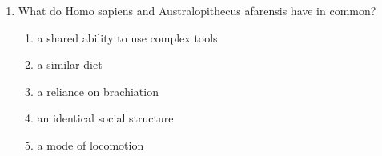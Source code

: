 \documentclass[12pt]{article}
\begin{document}
\begin{enumerate}[label=\arabic*.]
\begin{enumerate}[label=(\alph*)]
    \item both a and b
    \item Clovis
    \item Gravettian
    \item Mousterian
    \item Acheulean
\end{enumerate}
\item What do Homo sapiens and Australopithecus afarensis have in common?
\begin{enumerate}[label=(\alph*)]
    \item a shared ability to use complex tools
    \item a similar diet
    \item a reliance on brachiation
    \item an identical social structure
    \item a mode of locomotion
\end{enumerate}
\end{enumerate}
\end{document}
